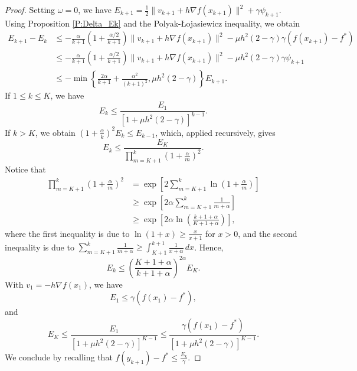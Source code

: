 \documentclass[onefignum,onetabnum]{siamart220329}
\begin{document}
\begin{proof}
Setting $\omega=0$, we have $E_{k+1} = \frac{1}{2}\| v_{k+1} + h\nabla f(x_{k+1}) \|^2 + \gamma\psi_{k+1}$. Using Proposition \ref{P:Delta_Ek} and the Polyak-\L ojasiewicz inequality, we obtain
\begin{align*}
E_{k+1} - E_k
&\le -\frac{\alpha}{k+1}\left( 1 + \tfrac{\alpha/2}{k+1} \right) \| v_{k+1} + h\nabla f(x_{k+1}) \|^2
     -\mu h^2(2-\gamma)\gamma \left( f(x_{k+1}) - f^* \right)\\
&\le -\frac{\alpha}{k+1}\left( 1 + \frac{\alpha/2}{k+1} \right) \| v_{k+1} + h\nabla f(x_{k+1}) \|^2
     -\mu h^2(2-\gamma)\gamma \psi_{k+1} \\
&\le -\min\left\{ \frac{2\alpha}{k+1} + \frac{\alpha^2}{(k+1)^2}, \mu h^2(2-\gamma) \right\} E_{k+1}.
\end{align*}
If $1\le k \le K$, we have
$$ E_k \le \frac{E_1}{ \left[ 1 + \mu h^2 (2-\gamma) \right]^{k-1} }. $$
If $k>K$, we obtain $(1+\frac{\alpha}{k})^2E_k \le E_{k-1}$, which, applied recursively, gives 
$$ E_k \le  \frac{E_K}{\prod_{m=K+1}^{k}\left( 1 + \frac{\alpha}{m} \right)^2}. $$
Notice that
\begin{align*}
\prod_{m=K+1}^{k}\left( 1 + \frac{\alpha}{m} \right)^2
&= \exp\left[ 2\sum_{m=K+1}^{k}\ln\left( 1 + \frac{\alpha}{m} \right) \right] \\
&\ge \exp\left[ 2\alpha\sum_{m=K+1}^{k}\frac{1}{m+\alpha} \right] \\
&\ge  \exp\left[ 2\alpha \ln\left(\frac{k+1+\alpha}{K+1+\alpha}\right) \right],
\end{align*}
where the first inequality is due to $\ln(1+x)\ge\frac{x}{x+1}$ for $x>0$, and the second inequality is due to $\sum_{m=K+1}^{k}\frac{1}{m+\alpha} \ge  \int_{K+1}^{k+1} \frac{1}{x+\alpha}\,d x $. Hence,
$$ E_k \le \left( \frac{K+1+\alpha}{k+1+\alpha} \right)^{2\alpha}E_K. $$
With $v_1 = -h\nabla f(x_1)$, we have
$$E_1 \le \gamma\left( f(x_1) - f^* \right),$$
and
$$E_K \le \frac{E_1}{ \left[ 1 + \mu h^2 (2-\gamma) \right]^{K-1} } \le \frac{\gamma\left( f(x_1) - f^* \right)}{ \left[ 1 + \mu h^2 (2-\gamma) \right]^{K-1} }.$$
We conclude by recalling that $f(y_{k+1}) - f^* \le \frac{E_k}{\gamma}$.



\end{proof}
\end{document}
